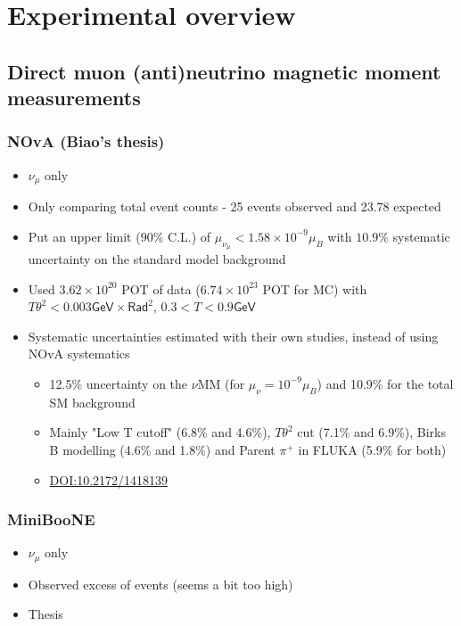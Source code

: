 \section{Experimental overview}

\subsection{Direct muon (anti)neutrino magnetic moment measurements}
\subsubsection{NOvA (Biao's thesis)}
\begin{itemize}
    \item $\nu_\mu$ only
    \item Only comparing total event counts - 25 events observed and 23.78 expected
    \item Put an upper limit ($90\%$ C.L.) of $\mu_{\nu_\mu}<1.58\times 10^{-9}\mu_B$ with $10.9\%$ systematic uncertainty on the standard model background
    \item Used $3.62\times 10^{20}$ POT of data ($6.74\times 10^{23}$ POT for MC) with $T\theta^2<0.003\textsf{GeV}\times\textsf{Rad}^2$, $0.3<T<0.9\textsf{GeV}$
    \item Systematic uncertainties estimated with their own studies, instead of using NOvA systematics
    \begin{itemize}
    	\item 12.5\% uncertainty on the $\nu$MM (for $\mu_\nu=10^{-9}\mu_B$) and 10.9\% for the total SM background
    	\item Mainly "Low T cutoff" (6.8\% and 4.6\%), $T\theta^2$ cut (7.1\% and 6.9\%), Birks B modelling (4.6\% and 1.8\%) and Parent $\pi^+$ in FLUKA (5.9\% for both)
    	\item \href{https://doi.org/10.2172/1418139}{DOI:10.2172/1418139}
    \end{itemize}
\end{itemize}

\subsubsection{MiniBooNE}
\begin{itemize}
    \item $\nu_\mu$ only
    \item Observed excess of events (seems a bit too high)
    \item Thesis
\end{itemize}

